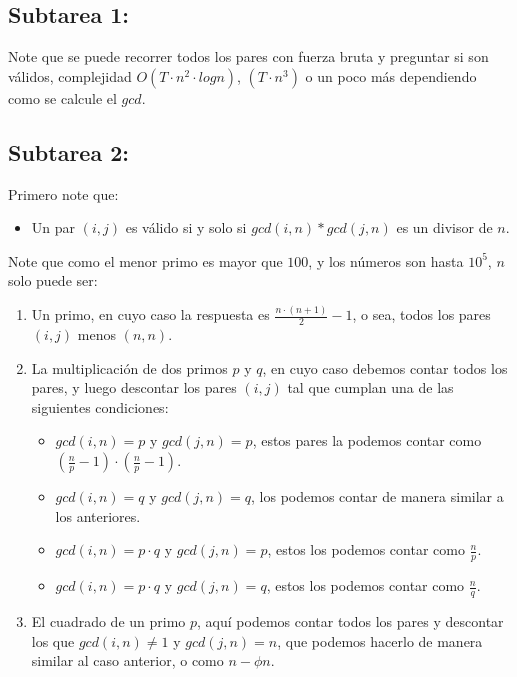 \hypertarget{subtarea-1}{%
\subsection{Subtarea 1:}\label{subtarea-1}}

Note que se puede recorrer todos los pares con fuerza bruta y preguntar
si son válidos, complejidad \(O(T\cdot n^2 \cdot log{n})\),
\((T\cdot n^3)\) o un poco más dependiendo como se calcule el \(gcd\).

\hypertarget{subtarea-2}{%
\subsection{Subtarea 2:}\label{subtarea-2}}

Primero note que:

\begin{itemize}
\tightlist
\item
  Un par \((i, j)\) es válido si y solo si \(gcd(i, n) * gcd(j, n)\) es
  un divisor de \(n\).
\end{itemize}

Note que como el menor primo es mayor que \(100\), y los números son
hasta \(10^5\), \(n\) solo puede ser:

\begin{enumerate}
\def\labelenumi{\arabic{enumi}.}
\item
  Un primo, en cuyo caso la respuesta es \(\frac{n\cdot{(n+1)}}{2}-1\),
  o sea, todos los pares \((i, j)\) menos \((n, n)\).
\item
  La multiplicación de dos primos \(p\) y \(q\), en cuyo caso debemos
  contar todos los pares, y luego descontar los pares \((i, j)\) tal que
  cumplan una de las siguientes condiciones:

  \begin{itemize}
  \item
    \(gcd(i,n) = p\) y \(gcd(j,n) = p\), estos pares la podemos contar
    como \((\frac{n}{p}-1) \cdot (\frac{n}{p}-1)\).
  \item
    \(gcd(i,n) = q\) y \(gcd(j,n) = q\), los podemos contar de manera
    similar a los anteriores.
  \item
    \(gcd(i,n) = p \cdot q\) y \(gcd(j,n) = p\), estos los podemos
    contar como \(\frac{n}{p}\).
  \item
    \(gcd(i,n) = p \cdot q\) y \(gcd(j,n) = q\), estos los podemos
    contar como \(\frac{n}{q}\).
  \end{itemize}
\item
  El cuadrado de un primo \(p\), aquí podemos contar todos los pares y
  descontar los que \(gcd(i,n) \neq 1\) y \(gcd(j,n) = n\), que podemos
  hacerlo de manera similar al caso anterior, o como \(n - \phi{n}\).
\end{enumerate}

